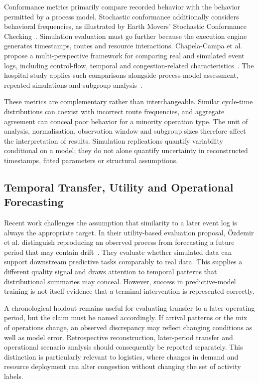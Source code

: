 Conformance metrics primarily compare recorded behavior with the behavior permitted by a process model. Stochastic conformance additionally considers behavioral frequencies, as illustrated by Earth Movers' Stochastic Conformance Checking~\cite{leeman2013EarthMovers}. Simulation evaluation must go further because the execution engine generates timestamps, routes and resource interactions. Chapela-Campa et al. propose a multi-perspective framework for comparing real and simulated event logs, including control-flow, temporal and congestion-related characteristics~\cite{Chapela2025SimQuality}. The hospital study applies such comparisons alongside process-model assessment, repeated simulations and subgroup analysis~\cite{Hospital2026Vinci}.

These metrics are complementary rather than interchangeable. Similar cycle-time distributions can coexist with incorrect route frequencies, and aggregate agreement can conceal poor behavior for a minority operation type. The unit of analysis, normalisation, observation window and subgroup sizes therefore affect the interpretation of results. Simulation replications quantify variability conditional on a model; they do not alone quantify uncertainty in reconstructed timestamps, fitted parameters or structural assumptions.

\subsection{Temporal Transfer, Utility and Operational Forecasting}

Recent work challenges the assumption that similarity to a later event log is always the appropriate target. In their utility-based evaluation proposal, \"Ozdemir et al. distinguish reproducing an observed process from forecasting a future period that may contain drift~\cite{Ozdemir2025UtilityBPS}. They evaluate whether simulated data can support downstream predictive tasks comparably to real data. This supplies a different quality signal and draws attention to temporal patterns that distributional summaries may conceal. However, success in predictive-model training is not itself evidence that a terminal intervention is represented correctly.

A chronological holdout remains useful for evaluating transfer to a later operating period, but the claim must be named accordingly. If arrival patterns or the mix of operations change, an observed discrepancy may reflect changing conditions as well as model error. Retrospective reconstruction, later-period transfer and operational scenario analysis should consequently be reported separately. This distinction is particularly relevant to logistics, where changes in demand and resource deployment can alter congestion without changing the set of activity labels.

